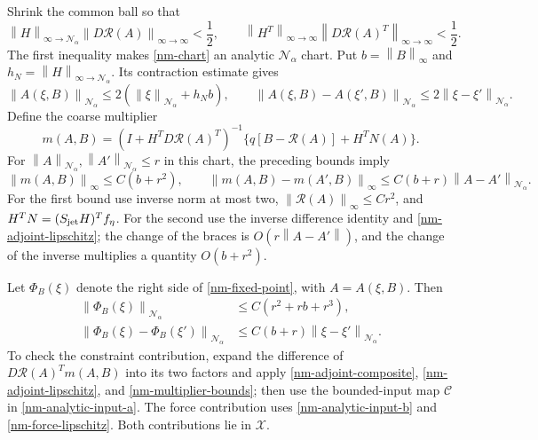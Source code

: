 \documentclass[11pt]{article}
\theoremstyle{remark}\newtheorem{remark}[theorem]{Remark}
\newcommand{\norm}[1]{\left\lVert#1\right\rVert}
\begin{document}
Shrink the common ball so that
\begin{equation}\label{nm-neumann-smallness}
 \norm{H}_{\infty\to\mathcal N_\alpha}
       \norm{D\mathcal R(A)}_{\infty\to\infty}<\frac12,
 \qquad
 \norm{H^T}_{\infty\to\infty}
       \norm{D\mathcal R(A)^T}_{\infty\to\infty}<\frac12.
\end{equation}
The first inequality makes \eqref{nm-chart} an analytic
$\mathcal N_\alpha$ chart. Put $b=\norm{B}_\infty$ and
$h_N=\norm{H}_{\infty\to\mathcal N_\alpha}$. Its contraction
estimate gives
\begin{equation}\label{nm-chart-estimates}
 \norm{A(\xi,B)}_{\mathcal N_\alpha}
 \le2(\norm{\xi}_{\mathcal N_\alpha}+h_Nb),\qquad
 \norm{A(\xi,B)-A(\xi',B)}_{\mathcal N_\alpha}
 \le2\norm{\xi-\xi'}_{\mathcal N_\alpha}.
\end{equation}
Define the coarse multiplier
\begin{equation}\label{nm-multiplier}
 m(A,B)=(I+H^TD\mathcal R(A)^T)^{-1}
             \{q[B-\mathcal R(A)]+H^TN(A)\}.
\end{equation}
For $\norm{A}_{\mathcal N_\alpha},\norm{A'}_{\mathcal N_\alpha}\le r$
in this chart, the preceding bounds imply
\begin{equation}\label{nm-multiplier-bounds}
 \norm{m(A,B)}_\infty\le C(b+r^2),\qquad
 \norm{m(A,B)-m(A',B)}_\infty
 \le C(b+r)\norm{A-A'}_{\mathcal N_\alpha}.
\end{equation}
For the first bound use inverse norm at most two,
$\norm{\mathcal R(A)}_\infty\le Cr^2$, and
$H^TN=(S_{\rm jet}H)^Tf_\eta$. For the second use the inverse
difference identity and \eqref{nm-adjoint-lipschitz}; the change
of the braces is $O(r\norm{A-A'})$, and the change of the inverse
multiplies a quantity $O(b+r^2)$.

Let $\Phi_B(\xi)$ denote the right side of
\eqref{nm-fixed-point}, with $A=A(\xi,B)$. Then
\begin{align}
 \norm{\Phi_B(\xi)}_{\mathcal N_\alpha}
 &\le C(r^2+rb+r^3),                                   \label{nm-contraction-size}\\
 \norm{\Phi_B(\xi)-\Phi_B(\xi')}_{\mathcal N_\alpha}
 &\le C(b+r)\norm{\xi-\xi'}_{\mathcal N_\alpha}.          \label{nm-contraction-lipschitz}
\end{align}
To check the constraint contribution, expand the difference of
$D\mathcal R(A)^Tm(A,B)$ into its two factors and apply
\eqref{nm-adjoint-composite}, \eqref{nm-adjoint-lipschitz}, and
\eqref{nm-multiplier-bounds}; then use the bounded-input map
$\mathcal C$ in \eqref{nm-analytic-input-a}. The force contribution
uses \eqref{nm-analytic-input-b} and
\eqref{nm-force-lipschitz}. Both contributions lie in $\mathcal X$.
\end{document}
